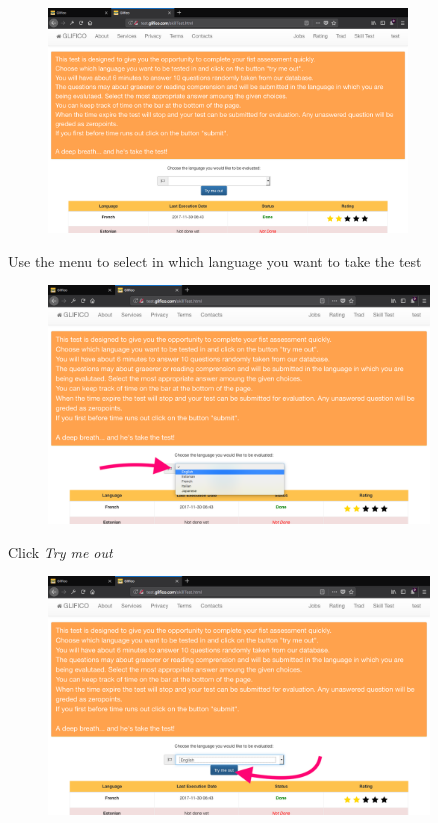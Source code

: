 \documentclass[11 pt, a4paper]{article}
\begin{document}
\begin{figure}[H]
\centering
\includegraphics[width=0.85\textwidth]{translator_skilltest1.png}
\end{figure}


\clearpage
Use the menu to select in which language you want to take the test
\begin{figure}[H]
\centering
\includegraphics[width=0.9\textwidth]{translator_skilltest2.png}
\end{figure}

Click \textit{Try me out}
\begin{figure}[H]
\centering
\includegraphics[width=0.9\textwidth]{translator_skilltest3.png}
\end{figure}
\end{document}
